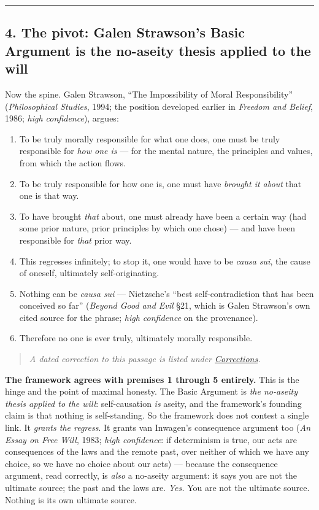 \documentclass[11pt]{article}
\begin{document}
\medskip\noindent\rule{\linewidth}{0.3pt}\medskip

\subsection*{4. The pivot: Galen Strawson's Basic Argument is the no-aseity thesis applied to the will}

Now the spine. Galen Strawson, ``The Impossibility of Moral Responsibility'' (\emph{Philosophical Studies}, 1994; the position developed earlier in \emph{Freedom and Belief}, 1986; \emph{high confidence}), argues:

\begin{enumerate}
\item To be truly morally responsible for what one does, one must be truly responsible for \emph{how one is} — for the mental nature, the principles and values, from which the action flows.
\item To be truly responsible for how one is, one must have \emph{brought it about} that one is that way.
\item To have brought \emph{that} about, one must already have been a certain way (had some prior nature, prior principles by which one chose) — and have been responsible for \emph{that} prior way.
\item This regresses infinitely; to stop it, one would have to be \emph{causa sui}, the cause of oneself, ultimately self-originating.
\item Nothing can be \emph{causa sui} — Nietzsche's ``best self-contradiction that has been conceived so far'' (\emph{Beyond Good and Evil} §21, which is Galen Strawson's own cited source for the phrase; \emph{high confidence} on the provenance).
\item Therefore no one is ever truly, ultimately morally responsible.
\end{enumerate}

\begin{quote}\small\emph{A dated correction to this passage is listed under \hyperref[corrections]{Corrections}.}\end{quote}

\textbf{The framework agrees with premises 1 through 5 entirely.} This is the hinge and the point of maximal honesty. The Basic Argument is \emph{the no-aseity thesis applied to the will}: self-causation \emph{is} aseity, and the framework's founding claim is that nothing is self-standing. So the framework does not contest a single link. It \emph{grants the regress}. It grants van Inwagen's consequence argument too (\emph{An Essay on Free Will}, 1983; \emph{high confidence}: if determinism is true, our acts are consequences of the laws and the remote past, over neither of which we have any choice, so we have no choice about our acts) — because the consequence argument, read correctly, is \emph{also} a no-aseity argument: it says you are not the ultimate source; the past and the laws are. \emph{Yes.} You are not the ultimate source. Nothing is its own ultimate source.
\end{document}

